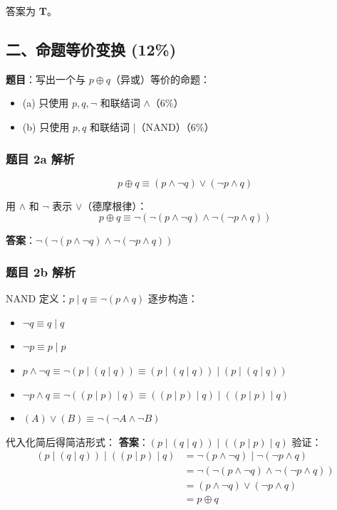 \documentclass[10pt,a4paper,openany]{ctexbook}
\theoremstyle{definition}
\theoremstyle{remark}
\begin{document}
答案为 \textbf{T}。
\vspace{-2pt}

\subsection{二、命题等价变换 (12\%)}

\textbf{题目}：写出一个与 $p \oplus q$（异或）等价的命题：
\begin{itemize}
\item (a) 只使用 $p, q, \neg$ 和联结词 $\land$（6\%）
\item (b) 只使用 $p, q$ 和联结词 $|$（NAND）（6\%）

\end{itemize}

\subsubsection{题目 2a 解析}

\[
p \oplus q \equiv (p \land \neg q) \lor (\neg p \land q)
\]

用 $\land$ 和 $\neg$ 表示 $\lor$（德摩根律）：
\[
p \oplus q \equiv \neg(\neg(p \land \neg q) \land \neg(\neg p \land q))
\]

\textbf{答案}：$\neg(\neg(p \land \neg q) \land \neg(\neg p \land q))$
\subsubsection{题目 2b 解析}

NAND 定义：$p \mid q \equiv \neg(p \land q)$
逐步构造：
\begin{itemize}
\item $\neg q \equiv q \mid q$
\item $\neg p \equiv p \mid p$
\item $p \land \neg q \equiv \neg(p \mid (q \mid q)) \equiv (p \mid (q \mid q)) \mid (p \mid (q \mid q))$
\item $\neg p \land q \equiv \neg((p \mid p) \mid q) \equiv ((p \mid p) \mid q) \mid ((p \mid p) \mid q)$
\item $(A) \lor (B) \equiv \neg(\neg A \land \neg B)$

\end{itemize}

代入化简后得简洁形式：
\textbf{答案}：$(p \mid (q \mid q)) \mid ((p \mid p) \mid q)$
验证：
\[
\begin{aligned}
(p \mid (q \mid q)) \mid ((p \mid p) \mid q)
&= \neg(p \land \neg q) \mid \neg(\neg p \land q) \\
&= \neg(\neg(p \land \neg q) \land \neg(\neg p \land q)) \\
&= (p \land \neg q) \lor (\neg p \land q) \\
&= p \oplus q
\end{aligned}
\]
\end{document}
